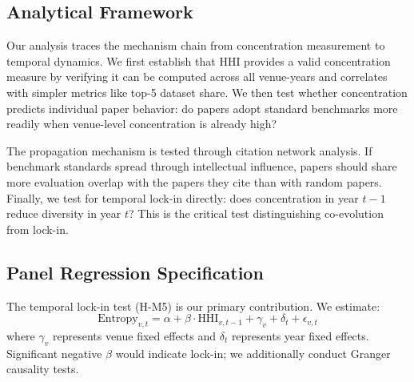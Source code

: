 \subsection{Analytical Framework}

Our analysis traces the mechanism chain from concentration measurement to temporal dynamics. We first establish that HHI provides a valid concentration measure by verifying it can be computed across all venue-years and correlates with simpler metrics like top-5 dataset share. We then test whether concentration predicts individual paper behavior: do papers adopt standard benchmarks more readily when venue-level concentration is already high?

The propagation mechanism is tested through citation network analysis. If benchmark standards spread through intellectual influence, papers should share more evaluation overlap with the papers they cite than with random papers. Finally, we test for temporal lock-in directly: does concentration in year $t-1$ reduce diversity in year $t$? This is the critical test distinguishing co-evolution from lock-in.

\subsection{Panel Regression Specification}

The temporal lock-in test (H-M5) is our primary contribution. We estimate:
\begin{equation}
\text{Entropy}_{v,t} = \alpha + \beta \cdot \text{HHI}_{v,t-1} + \gamma_v + \delta_t + \epsilon_{v,t}
\end{equation}
where $\gamma_v$ represents venue fixed effects and $\delta_t$ represents year fixed effects. Significant negative $\beta$ would indicate lock-in; we additionally conduct Granger causality tests.
